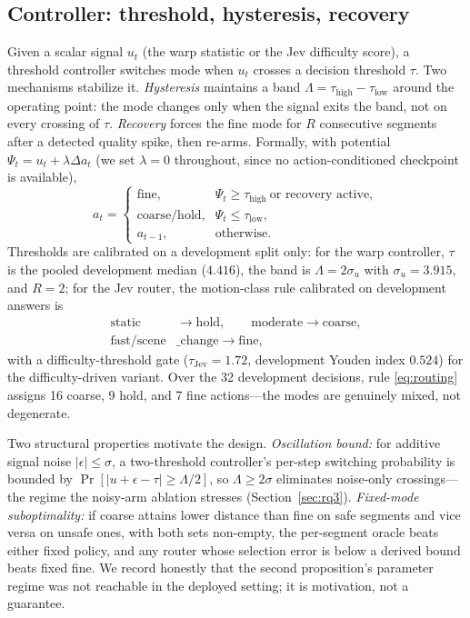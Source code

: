 \documentclass[journal]{IEEEtran}
\begin{document}
\subsection{Controller: threshold, hysteresis, recovery}
\label{sec:controller}
Given a scalar signal $u_t$ (the warp statistic or the Jev difficulty score), a threshold controller switches mode when $u_t$ crosses a decision threshold $\tau$. Two mechanisms stabilize it. \emph{Hysteresis} maintains a band $\Lambda = \tau_{\text{high}} - \tau_{\text{low}}$ around the operating point: the mode changes only when the signal exits the band, not on every crossing of $\tau$. \emph{Recovery} forces the fine mode for $R$ consecutive segments after a detected quality spike, then re-arms. Formally, with potential $\Psi_t = u_t + \lambda \Delta a_t$ (we set $\lambda{=}0$ throughout, since no action-conditioned checkpoint is available),
\begin{equation}
a_t =
\begin{cases}
\text{fine}, & \Psi_t \ge \tau_{\text{high}} \ \text{or recovery active},\\
\text{coarse/hold}, & \Psi_t \le \tau_{\text{low}},\\
a_{t-1}, & \text{otherwise}.
\end{cases}
\label{eq:policy}
\end{equation}
Thresholds are calibrated on a development split only: for the warp controller, $\tau$ is the pooled development median ($4.416$), the band is $\Lambda = 2\sigma_u$ with $\sigma_u = 3.915$, and $R{=}2$; for the Jev router, the motion-class rule calibrated on development answers is
\begin{equation}
\begin{aligned}
\text{static} &\rightarrow \text{hold},\qquad
\text{moderate} \rightarrow \text{coarse},\\
\text{fast}/\text{scene}&\text{\_change} \rightarrow \text{fine},
\end{aligned}
\label{eq:routing}
\end{equation}
with a difficulty-threshold gate ($\tau_{\text{Jev}} = 1.72$, development Youden index $0.524$) for the difficulty-driven variant. Over the 32 development decisions, rule \eqref{eq:routing} assigns 16 coarse, 9 hold, and 7 fine actions---the modes are genuinely mixed, not degenerate.

Two structural properties motivate the design. \emph{Oscillation bound:} for additive signal noise $|\epsilon| \le \sigma$, a two-threshold controller's per-step switching probability is bounded by $\Pr[|u + \epsilon - \tau| \ge \Lambda/2]$, so $\Lambda \ge 2\sigma$ eliminates noise-only crossings---the regime the noisy-arm ablation stresses (Section~\ref{sec:rq3}). \emph{Fixed-mode suboptimality:} if coarse attains lower distance than fine on safe segments and vice versa on unsafe ones, with both sets non-empty, the per-segment oracle beats either fixed policy, and any router whose selection error is below a derived bound beats fixed fine. We record honestly that the second proposition's parameter regime was not reachable in the deployed setting; it is motivation, not a guarantee.
\end{document}
